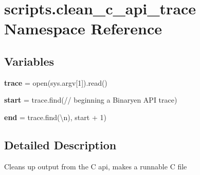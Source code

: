 \hypertarget{namespacescripts_1_1clean__c__api__trace}{}\section{scripts.\+clean\+\_\+c\+\_\+api\+\_\+trace Namespace Reference}
\label{namespacescripts_1_1clean__c__api__trace}
\subsection*{Variables}
\begin{DoxyCompactItemize}
\item 
\mbox{\label{namespacescripts_1_1clean__c__api__trace_aa8c38f4d71cff99cae91bca53b8b79c1}} 
{\bfseries trace} = open(sys.\+argv\mbox{[}1\mbox{]}).read()
\item 
\mbox{\label{namespacescripts_1_1clean__c__api__trace_a8f104a9d5cf4e981d86673304e610c1d}} 
{\bfseries start} = trace.\+find(\textquotesingle{}// beginning a Binaryen A\+PI trace\textquotesingle{})
\item 
\mbox{\label{namespacescripts_1_1clean__c__api__trace_aade5f6b9d7dcd87674999cd2fa5ec74e}} 
{\bfseries end} = trace.\+find(\textquotesingle{}\textbackslash{}n)\textquotesingle{}, start + 1)
\end{DoxyCompactItemize}


\subsection{Detailed Description}
\begin{DoxyVerb}Cleans up output from the C api, makes a runnable C file
\end{DoxyVerb}
 